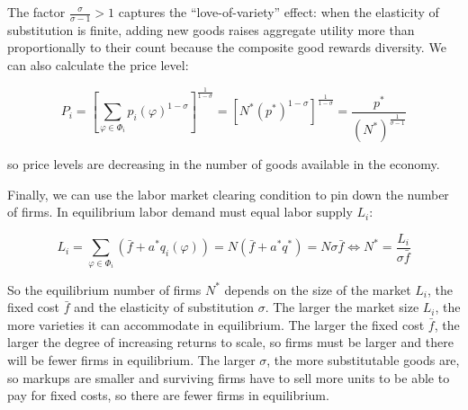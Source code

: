 \documentclass[11pt,letterpaper]{article}
\begin{document}
The factor $\tfrac{\sigma}{\sigma-1}>1$ captures the “love-of-variety” effect: when the elasticity of substitution is finite, adding new goods raises aggregate utility more than proportionally to their count because the composite good rewards diversity. We can also calculate the price level:


\begin{equation*}
    P_i = \left[ \sum_{\varphi \in \Phi_i } p_i(
\varphi)^{1-\sigma} \right]^{\tfrac{1}{1-\sigma} }  = \left[ N^* (p^*)^{1-\sigma} \right]^{\tfrac{1}{1-\sigma} }  = \frac{p^*}{(N^*)^{\tfrac{1}{\sigma-1} } } 
\end{equation*}

so price levels are decreasing in the number of goods available in the economy.

Finally, we can use the labor market clearing condition to pin down the number of firms. In equilibrium labor demand must equal labor supply $L_i$:

\begin{equation*}
    L_i = \sum_{\varphi \in \Phi_i} \left(\bar{f} + a^* q_i(\varphi) \right) = N\left(\bar{f} + a^* q^* \right) = N\sigma\bar{f} \iff N^* = \frac{L_i}{\sigma \bar{f}}
\end{equation*}

So the equilibrium number of firms $N^*$ depends on the size of the market $L_i$, the fixed cost $\bar{f}$ and the elasticity of substitution $\sigma$. The larger the market size $L_i$, the more varieties it can accommodate in equilibrium. The larger the fixed cost  $\bar{f}$, the larger the degree of increasing returns to scale, so firms must be larger and there will be fewer firms in equilibrium. The larger $\sigma$, the more substitutable goods are, so markups are smaller and surviving firms have to sell more units to be able to pay for fixed costs, so there are fewer firms in equilibrium.
\end{document}
